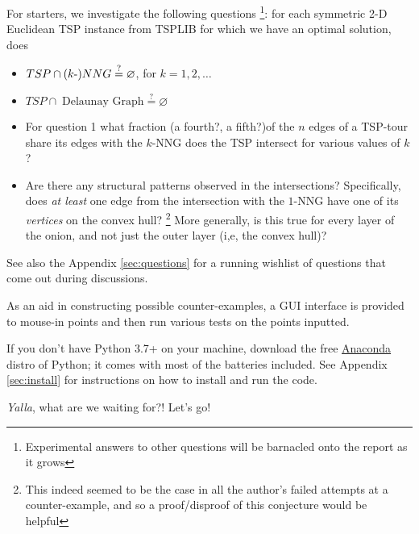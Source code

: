 \begin{description}
     For starters,  we investigate the following questions \footnote{Experimental answers to other questions will be barnacled onto the report as it grows}: 
     for each symmetric 2-D Euclidean TSP instance from TSPLIB for which we have an optimal solution, does

     \begin{itemize}
     \item $TSP \cap (k{\text -})NNG \stackrel{?}{=} \varnothing$, for $k=1,2,\ldots$
     \item $TSP \cap \; \text{Delaunay Graph} \stackrel{?}{=} \varnothing$
     \item For question 1 what fraction (a fourth?, a fifth?)of the $n$ edges of a TSP-tour share its edges with the  $k$-NNG does the TSP intersect for various values of $k$? 
     \item Are there any structural patterns observed in the intersections? Specifically, does \textit{at least } 
           one edge from the intersection with the $1$-NNG have one of its \textit{vertices} on the convex hull? 
           \footnote{This indeed seemed to be the case in all the author's failed attempts at a counter-example, and so a proof/disproof of this conjecture would be helpful}
           More generally, is this true for every layer of the onion, and not just the outer layer (i,e, the convex hull)?
     \end{itemize}

     See also the Appendix \autoref{sec:questions} for a running wishlist of questions that come out during discussions. 

     As an aid in constructing possible counter-examples, a GUI interface is provided to mouse-in points and then 
     run various tests on the points inputted. 
     
     If you don't have  Python 3.7+ on your machine, download the free  \href{https://www.anaconda.com/products/individual}{Anaconda} distro of Python; 
     it comes with most of the batteries included. See Appendix \autoref{sec:install} for instructions on how to install and run the code. 

     \textit{Yalla}, what are we waiting for?! Let’s go! 
\end{description}
